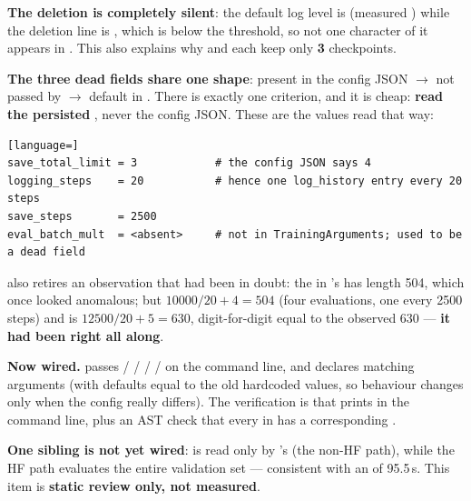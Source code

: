 \textbf{The deletion is completely silent}: the default  log level is
 (measured ) while the
deletion line is
, which is
below the threshold, so not one character of it appears in
. This also explains why  and
 each keep only \textbf{3} checkpoints.

\textbf{The three dead fields share one shape}: present in the config JSON $\rightarrow$ not
passed by  $\rightarrow$ default in . There is exactly one
criterion, and it is cheap: \textbf{read the persisted }, never the
config JSON. These are the values read that way:

\begin{lstlisting}[language=]
save_total_limit = 3            # the config JSON says 4
logging_steps    = 20           # hence one log_history entry every 20 steps
save_steps       = 2500
eval_batch_mult  = <absent>     # not in TrainingArguments; used to be a dead field
\end{lstlisting}

 also retires an observation that had been in doubt: the
 in 's  has length 504,
which once looked anomalous; but $10000/20 + 4 = 504$ (four evaluations, one every 2500
steps) and  is $12500/20 + 5 = 630$, digit-for-digit equal to the
observed 630 --- \textbf{it had been right all along}.

\textbf{Now wired.}  passes  /  /
 /  /  on the command line, and
 declares matching arguments (with defaults equal to the old hardcoded values,
so behaviour changes only when the config really differs). The verification is that
 prints  in the command
line, plus an AST check that every  in  has a corresponding
.

\textbf{One sibling is not yet wired}:  is read only by
's  (the non-HF path), while the HF  path
evaluates the entire validation set --- consistent with an  of 95.5\,s.
This item is \textbf{static review only, not measured}.

